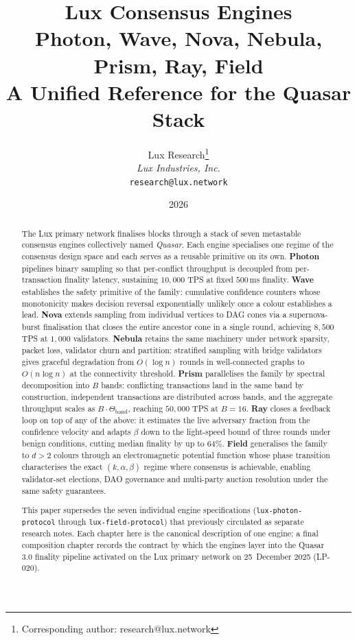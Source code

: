 \documentclass[11pt,a4paper]{report}
\title{\textbf{Lux Consensus Engines}\\[6pt]
\large Photon, Wave, Nova, Nebula, Prism, Ray, Field\\
A Unified Reference for the Quasar Stack}
\author{
Lux Research\thanks{Corresponding author: research@lux.network}\\
\textit{Lux Industries, Inc.}\\
\texttt{research@lux.network}
}
\date{2026}
\begin{document}
\luxcoverpage

\begin{abstract}
The Lux primary network finalises blocks through a stack of seven
metastable consensus engines collectively named \emph{Quasar}. Each
engine specialises one regime of the consensus design space and each
serves as a reusable primitive on its own. \textbf{Photon} pipelines
binary sampling so that per-conflict throughput is decoupled from
per-transaction finality latency, sustaining $10{,}000$ TPS at fixed
$500$\,ms finality. \textbf{Wave} establishes the safety primitive of
the family: cumulative confidence counters whose monotonicity makes
decision reversal exponentially unlikely once a colour establishes a
lead. \textbf{Nova} extends sampling from individual vertices to DAG
cones via a supernova-burst finalisation that closes the entire
ancestor cone in a single round, achieving $8{,}500$ TPS at $1{,}000$
validators. \textbf{Nebula} retains the same machinery under network
sparsity, packet loss, validator churn and partition: stratified
sampling with bridge validators gives graceful degradation from
$O(\log n)$ rounds in well-connected graphs to $O(n \log n)$ at the
connectivity threshold. \textbf{Prism} parallelises the family by
spectral decomposition into $B$ bands: conflicting transactions land
in the same band by construction, independent transactions are
distributed across bands, and the aggregate throughput scales as
$B \cdot \Theta_{\text{band}}$, reaching $50{,}000$ TPS at
$B = 16$. \textbf{Ray} closes a feedback loop on top of any of the
above: it estimates the live adversary fraction from the confidence
velocity and adapts $\beta$ down to the light-speed bound of three
rounds under benign conditions, cutting median finality by up to
$64\%$. \textbf{Field} generalises the family to $d > 2$ colours
through an electromagnetic potential function whose phase transition
characterises the exact $(k, \alpha, \beta)$ regime where consensus is
achievable, enabling validator-set elections, DAO governance and
multi-party auction resolution under the same safety guarantees.

This paper supersedes the seven individual engine specifications
(\texttt{lux-photon-protocol} through \texttt{lux-field-protocol})
that previously circulated as separate research notes. Each chapter
here is the canonical description of one engine; a final composition
chapter records the contract by which the engines layer into the
Quasar 3.0 finality pipeline activated on the Lux primary network on
25~December 2025 (LP-020).
\end{abstract}

\tableofcontents
\clearpage












\end{document}
